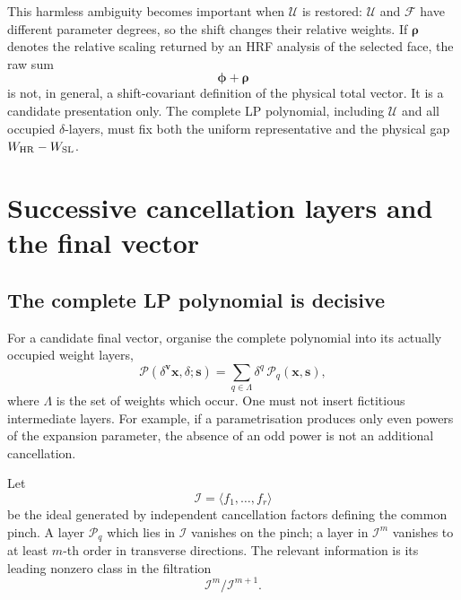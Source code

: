 \documentclass[a4paper,11pt]{article}
\newcommand{\x}{\boldsymbol{x}}
\newcommand{\s}{\boldsymbol{s}}
\newcommand{\WSL}{W_{\rm SL}}
\newcommand{\WHR}{W_{\rm HR}}
\newcommand{\ideal}{\mathcal I}
\begin{document}
This harmless ambiguity becomes important when \(\mathcal U\) is restored:
\(\mathcal U\) and \(\mathcal F\) have different parameter degrees, so the
shift changes their relative weights.  If \(\boldsymbol\rho\) denotes the
relative scaling returned by an HRF analysis of the selected face, the raw
sum
\begin{equation}
 \boldsymbol\phi+\boldsymbol\rho
\end{equation}
is not, in general, a shift-covariant definition of the physical total
vector.  It is a candidate presentation only.  The complete LP polynomial,
including \(\mathcal U\) and all occupied \(\delta\)-layers, must fix both the
uniform representative and the physical gap \(\WHR-\WSL\).

\section{Successive cancellation layers and the final vector}
\label{sec:layers}

\subsection{The complete LP polynomial is decisive}

For a candidate final vector, organise the complete polynomial into its
actually occupied weight layers,
\begin{equation}
 \mathcal P(\delta^{\boldsymbol v}\x,\delta;\s)
 =
 \sum_{q\in\Lambda}
 \delta^q\,\mathcal P_q(\x,\s),
\label{eq:weightlayers}
\end{equation}
where \(\Lambda\) is the set of weights which occur.  One must not insert
fictitious intermediate layers.  For example, if a parametrisation produces
only even powers of the expansion parameter, the absence of an odd power is
not an additional cancellation.

Let
\begin{equation}
 \ideal=\langle f_1,\ldots,f_r\rangle
\label{eq:pinchideal}
\end{equation}
be the ideal generated by independent cancellation factors defining the
common pinch.  A layer \(\mathcal P_q\) which lies in \(\ideal\) vanishes on
the pinch; a layer in \(\ideal^m\) vanishes to at least \(m\)-th order in
transverse directions.  The relevant information is its leading nonzero
class in the filtration
\begin{equation}
 \ideal^m/\ideal^{m+1}.
\label{eq:Iadic}
\end{equation}
\end{document}
